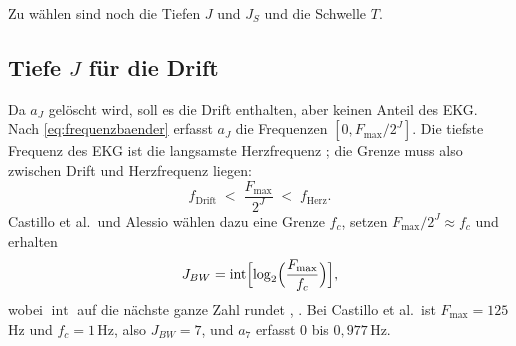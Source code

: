 \documentclass[a4paper,11pt,bibliography=totoc,listof=totoc,headinclude=true,cleardoublepage=empty,oneside]{scrbook}
\theoremstyle{plain}
\theoremstyle{definition}
\begin{document}
Zu wählen sind noch die Tiefen $J$ und $J_S$ und die Schwelle $T$.

\subsection{Tiefe $J$ für die Drift}
\label{sec:tiefe-J}

Da $a_J$ gelöscht wird, soll es die Drift enthalten, aber keinen Anteil des
EKG. Nach \eqref{eq:frequenzbaender} erfasst $a_J$ die Frequenzen
$[0, F_{\max}/2^J]$. Die tiefste Frequenz des EKG ist die langsamste
Herzfrequenz \cite[Kap.~7.1]{sornmo}; %
die Grenze muss also zwischen Drift und Herzfrequenz liegen:
\begin{equation}
\label{eq:j-bedingung}
  f_{\mathrm{Drift}} \;<\; \frac{F_{\max}}{2^J} \;<\; f_{\mathrm{Herz}} .
\end{equation}
Castillo et al.\ und Alessio wählen dazu eine Grenze $f_c$, setzen
$F_{\max}/2^J \approx f_c$ und erhalten
\begin{equation}
\label{eq:lbw}
  J_{BW} = \operatorname{int}\Bigl[\log_2\Bigl(\frac{F_{\max}}{f_c}\Bigr)\Bigr],
\end{equation}
wobei $\operatorname{int}$ auf die nächste ganze Zahl rundet
\cite[Abschn.~3.1.2, Gl.~(9)]{castillo}, %
\cite[Kap.~15.2.4]{alessio}. %
Bei Castillo et al.\ ist $F_{\max} = 125$\,Hz und $f_c = 1$\,Hz, also
$J_{BW} = 7$, und $a_7$ erfasst $0$ bis $0{,}977$\,Hz. %
\end{document}
